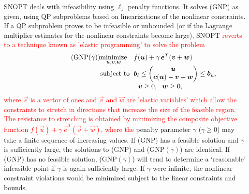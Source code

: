 \documentclass[twocolumn,numbook]{svjour3}          %
\makeatletter
\newcommand{\red}[1]{\textcolor{red}{#1}}
\def\u{{\vec u}}
\def\c{{\vec c}}
\def\w{{\vec w}}
\def\v{{\vec v}}
\def\e{{\vec e}}
\def\b{{\vec b}}
\def\A{{\vec A}}
\def\minim{\mathop{\hbox{\rm minimize}}}
\def\minimize#1{{\displaystyle\minim_{#1}}}
\def\subject{\mbox{\rm subject to}}
\def\strutl{\rule[-1.25ex]{0pt}{3ex}}%
\def\NP#1{NP$(#1)$}
\def\GNP#1{GNP$(#1)$}
\def\SNOPT {{\small SNOPT}}
\def\problem#1#2#3#4{%
   {\begin{tabular*}{0.47\textwidth}
    {@{}l@{\extracolsep{\fill}}l@{\extracolsep{6pt}}l@{\extracolsep{\fill}}c@{}}
      #1 & $\minimize{#2}$ & $#3$ & $ $ \\[5pt]
         & $\subject$      & $#4$ & $ $
    \end{tabular*}}}
\def\newproblem#1#2#3#4#5{%
   {\begin{tabular*}{0.47\textwidth}
    {@{}l@{\extracolsep{\fill}}l@{\extracolsep{6pt}}l@{\extracolsep{\fill}}c@{}}
      #1 & $\minimize{#2}$ & $#3$ & $ $ \\[5pt]
         & $\subject$      & $#4$ & $ $ \\[5pt]
         & & $#5$ & $ $
    \end{tabular*}}}
\newcommand{\pmat}[1]{\begin{pmatrix}#1\end{pmatrix}}
\makeatother
\begin{document}
\SNOPT{} deals with infeasibility using $\ell_1$ penalty functions.
%
%
It solves (GNP) as given, using QP subproblems
based on linearizations of the nonlinear constraints.
If a QP subproblem proves to be infeasible or unbounded (or if the
Lagrange multiplier estimates for the nonlinear constraints become
large), \SNOPT{} \red{reverts to a technique known as 'elastic programming' to solve the problem}
\[
   \newproblem{(\GNP{\gamma})}{\u,\v,\w}{f(\u) + \gamma \, \e^T(\v + \w)}
                 { \b_l \le \pmat{\u\\ \c(\u) - \v + \w \strutl} \le \b_u,}
                 { \ \ \v \ge 0, \ \ \w \ge 0,}
\]
\red{where $\e$ is a vector of ones and $\v$ and $\w$ are 'elastic variables' which allow the constraints to stretch in directions that increase the size of the feasible region. The resistance to stretching is obtained by minimizing the composite objective function $f(\u) + \gamma \, \e^T(\v + \w)$, where the} penalty parameter $\gamma$ ($\gamma \ge 0$) may take a
finite sequence of increasing values.  
If (GNP) has a feasible solution and $\gamma$ is sufficiently large,
the solutions to (GNP) and (\GNP{\gamma}) are identical.
If (GNP) has no feasible solution, (\GNP{\gamma}) will tend to
determine a `reasonable' infeasible point if $\gamma$ is again sufficiently
large.  If $\gamma$ were infinite, the nonlinear constraint violations would
be minimized subject to the linear constraints and bounds.
\end{document}
